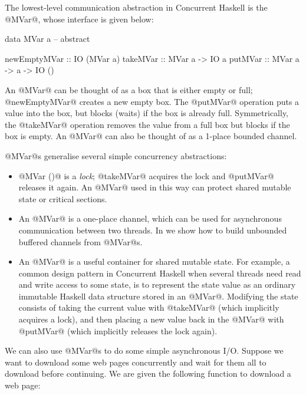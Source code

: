 
The lowest-level communication abstraction in Concurrent Haskell is
the @MVar@, whose interface is given below:

\begin{haskell}
data MVar a  -- abstract

newEmptyMVar :: IO (MVar a)
takeMVar     :: MVar a -> IO a
putMVar      :: MVar a -> a -> IO ()
\end{haskell}

\noindent An @MVar@ can be thought of as a box that is either empty
or full; @newEmptyMVar@ creates a new empty box.  The @putMVar@
operation puts a value into the box, but blocks (waits) if the box is
already full.  Symmetrically, the @takeMVar@ operation removes the value
from a full box but blocks if the box is empty.  An @MVar@ can also be
thought of as a 1-place bounded channel.

@MVar@s generalise several simple concurrency abstractions:

\begin{itemize}
\item @MVar ()@ is a \emph{lock}; @takeMVar@ acquires the lock and
  @putMVar@ releases it again.  An @MVar@ used in this way can protect
  shared mutable state or critical sections.

\item An @MVar@ is a one-place channel, which can be used for
  asynchronous communication between two threads.  In
   we show how to build unbounded buffered channels
  from @MVar@s.

\item An @MVar@ is a useful container for shared mutable state.  For
  example, a common design pattern in Concurrent Haskell when several
  threads need read and write access to some state, is to represent
  the state value as an ordinary immutable Haskell data structure
  stored in an @MVar@.  Modifying the state consists of taking the
  current value with @takeMVar@ (which implicitly acquires a lock),
  and then placing a new value back in the @MVar@ with @putMVar@
  (which implicitly releases the lock again).

\end{itemize}

We can also use @MVar@s to do some simple asynchronous I/O.  Suppose
we want to download some web pages concurrently and wait for them all
to download before continuing.  We are given the following function to
download a web page:

